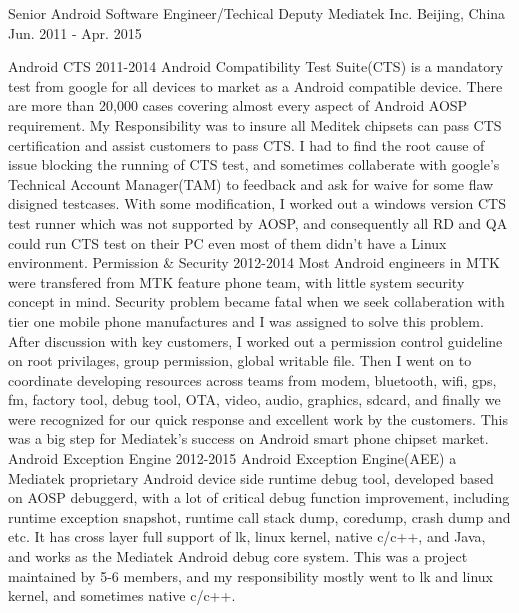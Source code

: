 \begin{cventries}
  \cventry
    {Senior Android Software Engineer/Techical Deputy} %
    {Mediatek Inc.} %
    {Beijing, China} %
    {Jun. 2011 - Apr. 2015} %
    {
      \begin{cvsubentries} %
        \cvsubentry
          {}
          {Android CTS}
          {2011-2014}
          {Android Compatibility Test Suite(CTS) is a mandatory test from google for all devices to market as a Android compatible device. There are more than 20,000 cases covering almost every aspect of Android AOSP requirement. My Responsibility was to insure all Meditek chipsets can pass CTS certification and assist customers to pass CTS. I had to find the root cause of issue blocking the running of CTS test, and sometimes collaberate with google's Technical Account Manager(TAM) to feedback and ask for waive for some flaw disigned testcases. With some modification, I worked out a windows version CTS test runner which was not supported by AOSP, and consequently all RD and QA could run CTS test on their PC even most of them didn't have a Linux environment.}
        \cvsubentry
          {}
          {Permission \& Security}
          {2012-2014}
          {Most Android engineers in MTK were transfered from MTK feature phone team, with little system security concept in mind. Security problem became fatal when we seek collaberation with tier one mobile phone manufactures and I was assigned to solve this problem. After discussion with key customers, I worked out a permission control guideline on root privilages, group permission, global writable file. Then I went on to coordinate developing resources across teams from modem, bluetooth, wifi, gps, fm, factory tool, debug tool, OTA, video, audio, graphics, sdcard, and finally we were recognized for our quick response and excellent work by the customers. This was a big step for Mediatek's success on Android smart phone chipset market.}
        \cvsubentry
          {}
          {Android Exception Engine}
          {2012-2015}
          {Android Exception Engine(AEE) a Mediatek proprietary Android device side runtime debug tool, developed based on AOSP debuggerd, with a lot of critical debug function improvement, including runtime exception snapshot, runtime call stack dump, coredump, crash dump and etc. It has cross layer full support of lk, linux kernel, native c/c++, and Java, and works as the Mediatek Android debug core system. This was a project maintained by 5-6 members, and my responsibility mostly went to lk and linux kernel, and sometimes native c/c++.}

\end{cvsubentries}}
\end{cventries}

